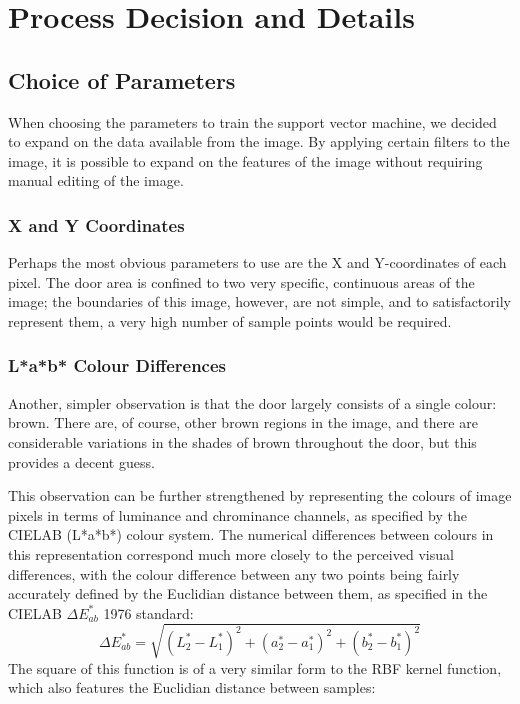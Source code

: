 \chapter{Process Decision and Details}

\section{Choice of Parameters}

When choosing the parameters to train the support vector machine, we decided to expand on the data available from the image. By applying certain filters to the image, it is possible to expand on the features of the image without requiring manual editing of the image.

 \subsection{X and Y Coordinates}
Perhaps the most obvious parameters to use are the X and Y-coordinates of each pixel.  The door area is confined to two very specific, continuous areas of the image; the boundaries of this image, however, are not simple, and to satisfactorily represent them, a very high number of sample points would be required.

\subsection{L*a*b* Colour Differences}
Another, simpler observation is that the door largely consists of a single colour: brown.  There are, of course, other brown regions in the image, and there are considerable variations in the shades of brown throughout the door, but this provides a decent guess.  

This observation can be further strengthened by representing the colours of image pixels in terms of luminance and chrominance channels, as specified by the CIELAB (L*a*b*) colour system. The numerical differences between colours in this representation correspond much more closely to the perceived visual differences, with the colour difference between any two points being fairly accurately defined by the Euclidian distance between them, as specified in the CIELAB $\Delta E_{ab}^*$ 1976 standard:
\begin{equation}
\Delta E_{ab}^* = \sqrt{ (L^*_2-L^*_1)^2+(a^*_2-a^*_1)^2 + (b^*_2-b^*_1)^2 }
\end{equation}
The square of this function is of a very similar form to the RBF kernel function, which also features the Euclidian distance between samples:

